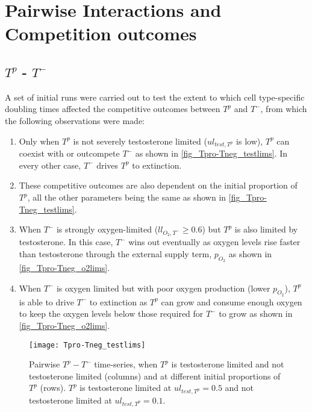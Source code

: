 
\chapter{Pairwise Interactions and Competition outcomes}
\section{$T^p$ - $T^-$}
A set of initial runs were carried out to test the extent to which cell type-specific doubling times affected the competitive outcomes between $T^p$ and $T^-$, from which the following observations were made:
\begin{enumerate}
  \item Only when $T^p$ is not severely testosterone limited ($ul_{test,T^p}$ is low), $T^p$ can coexist with or outcompete $T^-$ as shown in \autoref{fig_Tpro-Tneg_testlims}. In every other case, $T^-$ drives $T^p$ to extinction.
  \item These competitive outcomes are also dependent on the initial proportion of $T^p$, all the other parameters being the same as shown in \autoref{fig_Tpro-Tneg_testlims}.
  \item When $T^-$ is strongly oxygen-limited ($ll_{O_2,T^-} \geq 0.6$) but $T^p$ is also limited by testosterone. In this case, $T^-$ wins out eventually as oxygen levels rise faster than testosterone through the external supply term, $p_{O_2}$ as shown in \autoref{fig_Tpro-Tneg_o2lims}.
  \item When $T^-$ is oxygen limited but with poor oxygen production (lower $p_{O_2}$), $T^p$ is able to drive $T^-$ to extinction as $T^p$ can grow and consume enough oxygen to keep the oxygen levels below those required for $T^-$ to grow as shown in \autoref{fig_Tpro-Tneg_o2lims}.
\end{enumerate}

\begin{figure}[h!]
  \centering
  \texttt{[image: Tpro-Tneg\_testlims]}
  \caption[Pairwise $T^p - T^-$ time-series, testosterone limitation]{Pairwise $T^p - T^-$ time-series, when $T^p$ is testosterone limited and not testosterone limited (columns) and at different initial proportions of $T^p$ (rows). $T^p$ is testosterone limited at $ul_{test,T^p}=0.5$ and not testosterone limited at $ul_{test,T^p}=0.1$.}
  \label{fig_Tpro-Tneg_testlims}
\end{figure}


